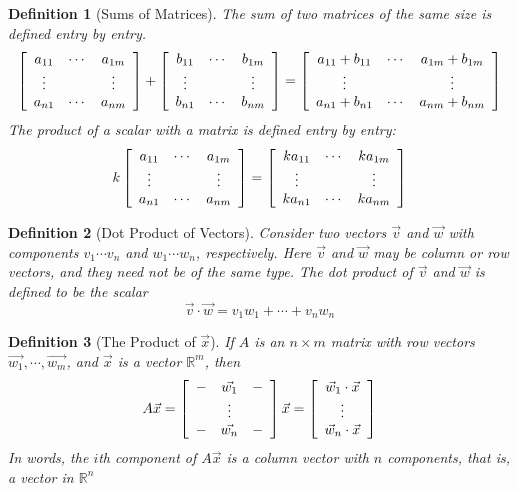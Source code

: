 \documentclass[10pt]{report}
\newtheorem{def2}{Definition}[section]
\begin{document}
\begin{def2}[Sums of Matrices]
The sum of two matrices of the same size is defined entry by entry.
$$\left[\begin{array}{c c c}
a_{11} & \cdots & a_{1m}\\
\vdots & & \vdots\\
a_{n1} & \cdots & a_{nm}
\end{array}\right]+ \left[\begin{array}{c c c}
b_{11} & \cdots & b_{1m}\\
\vdots & & \vdots\\
b_{n1} & \cdots & b_{nm}
\end{array}\right] = \left[\begin{array}{c c c}
a_{11}+b_{11} & \cdots & a_{1m} + b_{1m}\\
\vdots & & \vdots\\
a_{n1} + b_{n1} & \cdots & a_{nm} + b_{nm}
\end{array}\right]$$
The product of a scalar with a matrix is defined entry by entry:
$$k\left[\begin{array}{c c c}
a_{11} & \cdots & a_{1m}\\
\vdots & & \vdots\\
a_{n1} & \cdots & a_{nm}
\end{array}\right]= \left[\begin{array}{c c c}
ka_{11} & \cdots & ka_{1m}\\
\vdots & & \vdots\\
ka_{n1} & \cdots & ka_{nm}
\end{array}\right]$$
\end{def2}
\begin{def2}[Dot Product of Vectors]
Consider two vectors $\vec{v}$ and $\vec{w}$ with components $v_1 \cdots v_n$ and $w_1 \cdots w_n$, respectively. Here $\vec{v}$ and $\vec{w}$ may be column or row vectors, and they need not be of the same type. The dot product of $\vec{v}$ and $\vec{w}$ is defined to be the scalar
$$\vec{v} \cdot \vec{w} = v_1w_1 + \cdots + v_nw_n$$
\end{def2}
\begin{def2}[The Product of $\vec{x}$]
If $A$ is an $n\times m$ matrix with row vectors $\vec{w_1}, \cdots , \vec{w_m}$, and $\vec{x}$ is a vector $\mathbb{R}^m$, then
$$A\vec{x}=\left[ \begin{array}{c c c}
- & \vec{w_1} & -\\
& \vdots & \\
- & \vec{w_n} & -
\end{array}\right] \vec{x} = \left[ \begin{array}{c}
\vec{w}_1 \cdot \vec{x}\\
\vdots\\
\vec{w}_n \cdot \vec{x}
\end{array}\right]$$
In words, the $i$th component of $A\vec{x}$ is a column vector with $n$ components, that is, a vector in $\mathbb{R}^n$
\end{def2}
\end{document}
